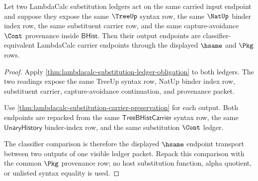 \begin{theorem}
\label{thm:lambdacalc-substitution-output-determinacy}
Let two LambdaCalc substitution ledgers act on the same carried input endpoint
and suppose they expose the same $\TreeUp$ syntax row, the same $\NatUp$ binder
index row, the same substituent carrier row, and the same capture-avoidance
$\Cont$ provenance inside $\mathsf{BHist}$. Then their output endpoints are
classifier-equivalent LambdaCalc carrier endpoints through the displayed
$\hsame$ and $\Pkg$ rows.
\end{theorem}
\begin{proof}
Apply \autoref{thm:lambdacalc-substitution-ledger-obligation} to both ledgers.
The two readings expose the same TreeUp syntax row, NatUp binder index row,
substituent carrier, capture-avoidance continuation, and provenance packet.

Use \autoref{thm:lambdacalc-substitution-carrier-preservation} for each output.
Both endpoints are repacked from the same $\mathsf{TreeBHistCarrier}$ syntax
row, the same $\mathsf{UnaryHistory}$ binder-index row, and the same
substitution $\Cont$ ledger.

The classifier comparison is therefore the displayed $\hsame$ endpoint
transport between two outputs of one visible ledger packet. Repack this
comparison with the common $\Pkg$ provenance row; no host substitution
function, alpha quotient, or unlisted syntax equality is used.
\end{proof}

